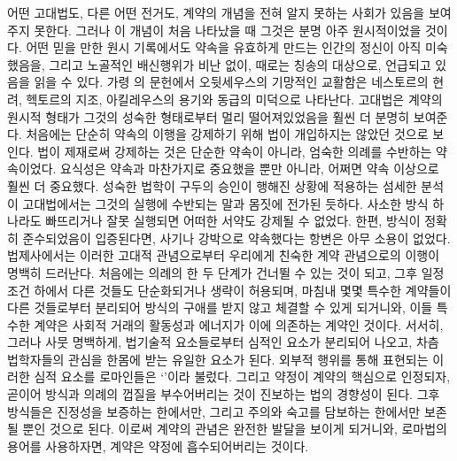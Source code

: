 어떤 고대법도, 다른 어떤 전거도,
계약의 개념을 전혀 알지 못하는 사회가 있음을 보여주지 못한다.
그러나 이 개념이 처음 나타났을 때
그것은 분명 아주 원시적이었을 것이다.
어떤 믿을 만한 원시 기록에서도
약속을 유효하게 만드는 인간의 정신이 아직 미숙했음을,
그리고
노골적인 배신행위가 비난 없이, 때로는 칭송의 대상으로, 언급되고 있음을
읽을  수 있다.
가령 의 문헌에서
오뒷세우스의 기망적인 교활함은
네스토르의 현려, 헥토르의 지조,
아킬레우스의 용기와 동급의 미덕으로 나타난다.
고대법은 계약의 원시적 형태가 그것의 성숙한 형태로부터
멀리 떨어져있었음을 훨씬 더 분명히 보여준다.
처음에는 단순히 약속의 이행을 강제하기 위해
법이 개입하지는 않았던 것으로 보인다.
법이 제재로써 강제하는 것은 단순한 약속이 아니라,
엄숙한 의례를 수반하는 약속이었다.
요식성은 약속과 마찬가지로 중요했을 뿐만 아니라,
어쩌면 약속 이상으로 훨씬 더 중요했다.
성숙한 법학이 구두의 승인이 행해진 상황에 적용하는
섬세한 분석이
고대법에서는
그것의 실행에 수반되는 말과 몸짓에 전가된 듯하다.
사소한 방식 하나라도 빠뜨리거나 잘못 실행되면 어떠한 서약도
강제될 수 없었다.
한편, 방식이 정확히 준수되었음이 입증된다면,
사기나 강박으로 약속했다는 항변은 아무 소용이 없었다.
법제사에서는
이러한 고대적 관념으로부터 우리에게 친숙한 계약 관념으로의 이행이
명백히 드러난다.
처음에는 의례의 한 두 단계가 건너뛸 수 있는 것이 되고,
그후 일정 조건 하에서 다른 것들도 단순화되거나 생략이 허용되며,
마침내 몇몇 특수한 계약들이 다른 것들로부터 분리되어
방식의 구애를 받지 않고 체결할 수 있게 되거니와,
이들 특수한 계약은
사회적 거래의 활동성과 에너지가
이에
의존하는 계약인 것이다.
서서히, 그러나 사뭇 명백하게,
법기술적 요소들로부터 심적인 요소가 분리되어 나오고,
차츰 법학자들의 관심을 한몸에 받는 유일한 요소가 된다.
외부적 행위를 통해 표현되는
이러한 심적 요소를 로마인들은
`'이라 불렀다.
그리고 약정이 계약의 핵심으로 인정되자,
곧이어
방식과 의례의 껍질을 부수어버리는 것이
진보하는 법의 경향성이 된다.
그후 방식들은 진정성을 보증하는 한에서만,
그리고 주의와 숙고를 담보하는 한에서만
보존될 뿐인 것으로 된다.
이로써 계약의 관념은 완전한 발달을 보이게 되거니와,
로마법의 용어를 사용하자면,
계약은 약정에 흡수되어버리는 것이다.

